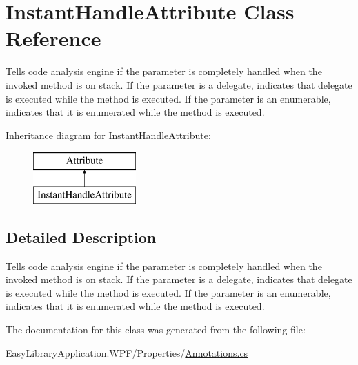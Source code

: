 \hypertarget{class_instant_handle_attribute}{}\section{Instant\+Handle\+Attribute Class Reference}
\label{class_instant_handle_attribute}


Tells code analysis engine if the parameter is completely handled when the invoked method is on stack. If the parameter is a delegate, indicates that delegate is executed while the method is executed. If the parameter is an enumerable, indicates that it is enumerated while the method is executed.  


Inheritance diagram for Instant\+Handle\+Attribute\+:\begin{figure}[H]
\begin{center}
\leavevmode
\includegraphics[height=2.000000cm]{class_instant_handle_attribute}
\end{center}
\end{figure}


\subsection{Detailed Description}
Tells code analysis engine if the parameter is completely handled when the invoked method is on stack. If the parameter is a delegate, indicates that delegate is executed while the method is executed. If the parameter is an enumerable, indicates that it is enumerated while the method is executed. 



The documentation for this class was generated from the following file\+:\begin{DoxyCompactItemize}
\item 
Easy\+Library\+Application.\+W\+P\+F/\+Properties/\mbox{\hyperlink{_annotations_8cs}{Annotations.\+cs}}\end{DoxyCompactItemize}
